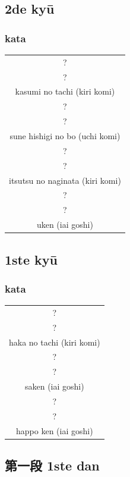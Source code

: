 \documentclass[a4paper, 12pt]{article}
\begin{document}
\begin{CJK}{UTF8}{min}
\subsection{2de ky\={u}}
\subsubsection{kata}
\begin{table}[H]
\begin{center}
\begin{tabular}{c}
?\\
?\\
kasumi no tachi (kiri komi)\\
\hline
?\\
?\\
sune hishigi no bo (uchi komi)\\
\hline
?\\
?\\
itsutsu no naginata (kiri komi)\\
\hline
?\\
?\\
uken (iai goshi)
\end{tabular}
\end{center}
\label{kyuu_2_katori_kata}
\end{table}

\subsection{1ste ky\={u}}
\subsubsection{kata}
\begin{table}[H]
\begin{center}
\begin{tabular}{c}
?\\
?\\
haka no tachi (kiri komi)\\
\hline
?\\
?\\
saken (iai goshi)\\
\hline
?\\
?\\
happo ken (iai goshi)
\end{tabular}
\end{center}
\label{kyuu_1_katori_kata}
\end{table}

\subsection{第一段 1ste dan}

\end{CJK}
\end{document}
